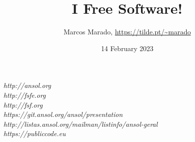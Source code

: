 \documentclass[landscape]{slides}
\author{Marcos Marado, \url{https://tilde.pt/~marado}}
\title{I \heart Free Software!}
\date{14 February 2023}
\begin{document}

\begin{slide}
\maketitle
\end{slide}



\begin{slide}

\emph{http://ansol.org} \\
\emph{http://fsfe.org} \\
\emph{http://fsf.org} \\
\emph{https://git.ansol.org/ansol/presentation} \\
\emph{http://listas.ansol.org/mailman/listinfo/ansol-geral} \\
\emph{https://publiccode.eu}
\end{slide}
\end{document}

